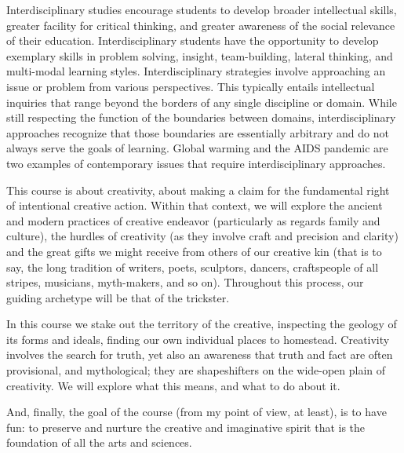 \documentclass{report}
\begin{document}
Interdisciplinary studies encourage students to develop broader
intellectual skills, greater facility for critical thinking, and
greater awareness of the social relevance of their education.
Interdisciplinary students have the opportunity to develop exemplary
skills in problem solving, insight, team-building, lateral thinking,
and multi-modal learning styles. Interdisciplinary strategies involve
approaching an issue or problem from various perspectives. This
typically entails intellectual inquiries that range beyond the borders
of any single discipline or domain. While still respecting the
function of the boundaries between domains, interdisciplinary
approaches recognize that those boundaries are essentially arbitrary
and do not always serve the goals of learning. Global warming and the
AIDS pandemic are two examples of contemporary issues that require
interdisciplinary approaches.

This course is about creativity, about making a claim for the
fundamental right of intentional creative action. Within that context,
we will explore the ancient and modern practices of creative endeavor
(particularly as regards family and culture), the hurdles of
creativity (as they involve craft and precision and clarity) and the
great gifts we might receive from others of our creative kin (that is
to say, the long tradition of writers, poets, sculptors, dancers,
craftspeople of all stripes, musicians, myth-makers, and so on).
Throughout this process, our guiding archetype will be that of the
trickster.

In this course we stake out the territory of the creative, inspecting
the geology of its forms and ideals, finding our own individual places
to homestead. Creativity involves the search for truth, yet also an
awareness that truth and fact are often provisional, and mythological;
they are shapeshifters on the wide-open plain of creativity. We will
explore what this means, and what to do about it.

And, finally, the goal of the course (from my point of view, at
least), is to have fun: to preserve and nurture the creative and
imaginative spirit that is the foundation of all the arts and
sciences.
\end{document}
